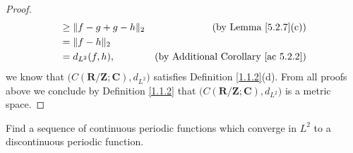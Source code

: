 \begin{proof}
\begin{align*}
                                      & \geq \lVert f - g + g - h\rVert_2         & \text{(by Lemma \ref{5.2.7}(c))}                \\
                                      & = \lVert f - h\rVert_2                                                                      \\
                                      & = d_{L^2}(f, h),                    & \text{(by Additional Corollary \ref{ac 5.2.2})}
    \end{align*}
    we know that \(\big(C(\mathbf{R} / \mathbf{Z} ; \mathbf{C}), d_{L^2}\big)\) satisfies Definition \ref{1.1.2}(d).
    From all proofs above we conclude by Definition \ref{1.1.2} that \(\big(C(\mathbf{R} / \mathbf{Z} ; \mathbf{C}), d_{L^2}\big)\) is a metric space.
\end{proof}

\begin{exercise}\label{ex 5.2.5}
    Find a sequence of continuous periodic functions which converge in \(L^2\) to a discontinuous periodic function.
\end{exercise}

